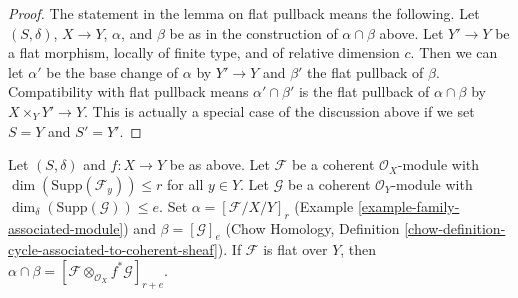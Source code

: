\begin{proof}
\medskip\noindent
The statement in the lemma on flat pullback means the following.
Let $(S, \delta)$, $X \to Y$, $\alpha$, and $\beta$ be as in the
construction of $\alpha \cap \beta$ above. Let $Y' \to Y$ be a flat
morphism, locally of finite type, and of relative dimension $c$. Then
we can let $\alpha'$ be the base change of $\alpha$ by $Y' \to Y$
and $\beta'$ the flat pullback of $\beta$. Compatibility with flat
pullback means $\alpha' \cap \beta'$ is the flat pullback of
$\alpha \cap \beta$ by $X \times_Y Y' \to Y$. This is actually
a special case of the discussion above if we set $S = Y$ and $S' = Y'$.
\end{proof}

\begin{lemma}
\label{lemma-action-coherent}
Let $(S, \delta)$ and $f : X \to Y$ be as above.
Let $\mathcal{F}$ be a coherent $\mathcal{O}_X$-module
with $\dim(\text{Supp}(\mathcal{F}_y)) \leq r$ for all $y \in Y$.
Let $\mathcal{G}$ be a coherent $\mathcal{O}_Y$-module
with $\dim_\delta(\text{Supp}(\mathcal{G})) \leq e$.
Set $\alpha = [\mathcal{F}/X/Y]_r$
(Example \ref{example-family-associated-module}) and
$\beta = [\mathcal{G}]_e$ (Chow Homology, Definition
\ref{chow-definition-cycle-associated-to-coherent-sheaf}).
If $\mathcal{F}$ is flat over $Y$, then $\alpha \cap \beta =
[\mathcal{F} \otimes_{\mathcal{O}_X} f^*\mathcal{G}]_{r + e}$.
\end{lemma}

